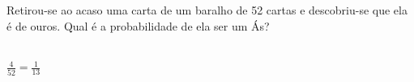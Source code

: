 \begin{ex}
Retirou-se ao acaso uma carta de um baralho de 52 cartas e descobriu-se que ela é de ouros. Qual é a probabilidade de ela ser um Ás?
   \begin{sol}
     \phantom{A} \\
     $\frac{4}{52}=\frac{1}{13}$
   \end{sol}
\end{ex}